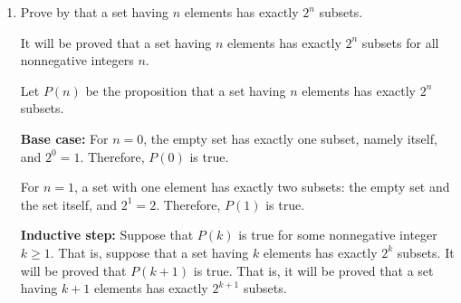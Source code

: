 \begin{enumerate}
\begin{subprove}
    Let \(S_{n} = a + a r + a r^{2} + \ldots + a r^{n-1}\) be the sum of the first \(n\) terms.
    
    If \(r = 1\), then \(S_{n} = a + a + \ldots + a = n a\).
    
    If \(r \neq 1\), let \(P(n)\) be the proposition that \(S_{n} = \frac{a(r^{n} - 1)}{r - 1}\).
    
    \textbf{Base case:} For \(n = 1\), the left-hand side is \(S_{1} = a\), and the right-hand side is \(\frac{a(r^{1} - 1)}{r - 1} = \frac{a(r - 1)}{r - 1} = a\).
    Therefore, \(P(1)\) is true.
    
    \textbf{Inductive step:} Suppose that \(P(k)\) is true for some positive integer \(k\).
    That is, suppose that \(S_{k} = \frac{a(r^{k} - 1)}{r - 1}\).
    It will be proved that \(P(k+1)\) is true.
    That is, it will be proved that \(S_{k+1} = \frac{a(r^{k+1} - 1)}{r - 1}\).
    
    By definition, \(S_{k+1} = S_{k} + a r^{k}\).
    By the inductive hypothesis, \(S_{k} = \frac{a(r^{k} - 1)}{r - 1}\).
    Therefore, \(S_{k+1} = \frac{a(r^{k} - 1)}{r - 1} + a r^{k} = \frac{a(r^{k} - 1) + a r^{k}(r - 1)}{r - 1} = \frac{a r^{k} - a + a r^{k+1} - a r^{k}}{r - 1} = \frac{a r^{k+1} - a}{r - 1} = \frac{a(r^{k+1} - 1)}{r - 1}\).
    
    Therefore, \(P(k+1)\) is true.
    
    By , it follows that \(P(n)\) is true for all positive integers \(n\).
  \end{subprove}
  \item Prove by  that a set having \(n\) elements has exactly \(2^{n}\) subsets.
  \begin{subprove}
    It will be proved that a set having \(n\) elements has exactly \(2^{n}\) subsets for all nonnegative integers \(n\).
    
    Let \(P(n)\) be the proposition that a set having \(n\) elements has exactly \(2^{n}\) subsets.
    
    \textbf{Base case:} For \(n = 0\), the empty set has exactly one subset, namely itself, and \(2^{0} = 1\).
    Therefore, \(P(0)\) is true.
    
    For \(n = 1\), a set with one element has exactly two subsets: the empty set and the set itself, and \(2^{1} = 2\).
    Therefore, \(P(1)\) is true.
    
    \textbf{Inductive step:} Suppose that \(P(k)\) is true for some nonnegative integer \(k \geq 1\).
    That is, suppose that a set having \(k\) elements has exactly \(2^{k}\) subsets.
    It will be proved that \(P(k+1)\) is true.
    That is, it will be proved that a set having \(k+1\) elements has exactly \(2^{k+1}\) subsets.
    

\end{subprove}
\end{enumerate}
